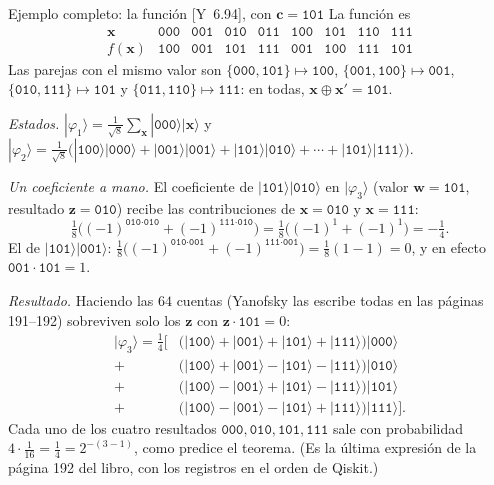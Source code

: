 \documentclass[11pt, a4paper, twoside, openright]{report}
\providecommand{\ket}[1]{|#1\rangle}
\newcommand{\bx}{\mathbf{x}}
\newcommand{\bz}{\mathbf{z}}
\newcommand{\bc}{\mathbf{c}}
\newcommand{\bw}{\mathbf{w}}
\newcommand{\Yan}[1]{\textcolor{rosaviejo}{\small[Y~#1]}}  %
\begin{document}
\begin{ejemplo}{Ejemplo completo: la función \Yan{6.94}, con $\bc = \texttt{101}$}
La función es
\[
\begin{array}{c|cccccccc}
\bx & \texttt{000} & \texttt{001} & \texttt{010} & \texttt{011} & \texttt{100} & \texttt{101} & \texttt{110} & \texttt{111} \\ \hline
f(\bx) & \texttt{100} & \texttt{001} & \texttt{101} & \texttt{111} & \texttt{001} & \texttt{100} & \texttt{111} & \texttt{101}
\end{array}
\]
Las parejas con el mismo valor son $\{\texttt{000},\texttt{101}\}\mapsto\texttt{100}$, $\{\texttt{001},\texttt{100}\}\mapsto\texttt{001}$, $\{\texttt{010},\texttt{111}\}\mapsto\texttt{101}$ y $\{\texttt{011},\texttt{110}\}\mapsto\texttt{111}$: en todas, $\bx\oplus\bx' = \texttt{101}$.

\textit{Estados.} $\ket{\varphi_1} = \frac{1}{\sqrt8}\sum_{\bx}\ket{\texttt{000}}\ket{\bx}$ y $\ket{\varphi_2} = \frac{1}{\sqrt8}\big(\ket{\texttt{100}}\ket{\texttt{000}} + \ket{\texttt{001}}\ket{\texttt{001}} + \ket{\texttt{101}}\ket{\texttt{010}} + \cdots + \ket{\texttt{101}}\ket{\texttt{111}}\big)$.

\textit{Un coeficiente a mano.} El coeficiente de $\ket{\texttt{101}}\ket{\texttt{010}}$ en $\ket{\varphi_3}$ (valor $\bw = \texttt{101}$, resultado $\bz = \texttt{010}$) recibe las contribuciones de $\bx = \texttt{010}$ y $\bx = \texttt{111}$:
\[ \tfrac18\big((-1)^{\texttt{010}\cdot\texttt{010}} + (-1)^{\texttt{111}\cdot\texttt{010}}\big) = \tfrac18\big((-1)^1 + (-1)^1\big) = -\tfrac14. \]
El de $\ket{\texttt{101}}\ket{\texttt{001}}$: $\tfrac18\big((-1)^{\texttt{010}\cdot\texttt{001}} + (-1)^{\texttt{111}\cdot\texttt{001}}\big) = \tfrac18(1 - 1) = 0$, y en efecto $\texttt{001}\cdot\texttt{101} = 1$.

\textit{Resultado.} Haciendo las $64$ cuentas (Yanofsky las escribe todas en las páginas 191--192) sobreviven solo los $\bz$ con $\bz\cdot\texttt{101} = 0$:
\begin{align*}
\ket{\varphi_3} = \tfrac14\Big[ &\big(\ket{\texttt{100}} + \ket{\texttt{001}} + \ket{\texttt{101}} + \ket{\texttt{111}}\big)\ket{\texttt{000}} \\ + &\big(\ket{\texttt{100}} + \ket{\texttt{001}} - \ket{\texttt{101}} - \ket{\texttt{111}}\big)\ket{\texttt{010}} \\
+ &\big(\ket{\texttt{100}} - \ket{\texttt{001}} + \ket{\texttt{101}} - \ket{\texttt{111}}\big)\ket{\texttt{101}} \\ + &\big(\ket{\texttt{100}} - \ket{\texttt{001}} - \ket{\texttt{101}} + \ket{\texttt{111}}\big)\ket{\texttt{111}} \Big].
\end{align*}
Cada uno de los cuatro resultados $\texttt{000}, \texttt{010}, \texttt{101}, \texttt{111}$ sale con probabilidad $4\cdot\frac{1}{16} = \frac14 = 2^{-(3-1)}$, como predice el teorema. (Es la última expresión de la página 192 del libro, con los registros en el orden de Qiskit.)


\end{ejemplo}
\end{document}
